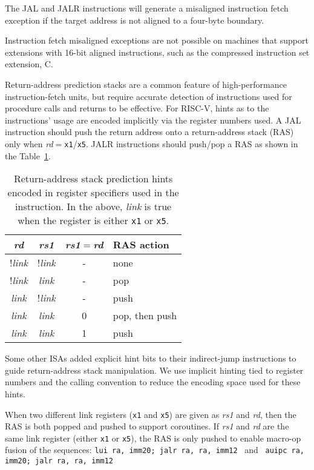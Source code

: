 The JAL and JALR instructions will generate a misaligned instruction
fetch exception if the target address is not aligned to a four-byte
boundary.

\begin{commentary}
Instruction fetch misaligned exceptions are not possible on machines
that support extensions with 16-bit aligned instructions, such as the
compressed instruction set extension, C.
\end{commentary}

Return-address prediction stacks are a common feature of
high-performance instruction-fetch units, but require accurate
detection of instructions used for procedure calls and returns to be
effective.  For RISC-V, hints as to the instructions' usage are encoded
implicitly via the register numbers used.  A JAL instruction should
push the return address onto a return-address stack (RAS) only when
{\em rd}$=${\tt x1}/{\tt x5}.  JALR instructions should push/pop a
RAS as shown in the Table~\ref{rashints}.
\begin{table}[hbt]
\centering
\begin{tabular}{|c|c|c|l|}
  \hline
  \em rd & \em rs1 & {\em rs1}$=${\em rd} & RAS action \\
  \hline
  !{\em link} & !{\em link} & - & none \\
  !{\em link} &  {\em link} & - & pop \\
   {\em link} & !{\em link} & - & push  \\
   {\em link} &  {\em link} & 0 & pop, then push \\
   {\em link} &  {\em link} & 1 & push \\
   \hline
\end{tabular}
\caption{Return-address stack prediction hints encoded in register
  specifiers used in the instruction.  In the above, {\em link} is
  true when the register is either {\tt x1} or {\tt x5}.}
\label{rashints}
\end{table}

\begin{commentary}
Some other ISAs added explicit hint bits to their indirect-jump instructions
to guide return-address stack manipulation.  We use implicit hinting tied to
register numbers and the calling convention to reduce the encoding space used
for these hints.

When two different link registers ({\tt x1} and {\tt x5}) are given as
{\em rs1} and {\em rd}, then the RAS is both popped and pushed to
support coroutines.  If {\em rs1} and {\em rd} are the same link
register (either {\tt x1} or {\tt x5}), the RAS is only pushed to
enable macro-op fusion of the sequences:\linebreak
{\tt lui ra, imm20; jalr ra, ra, imm12} \ and \ 
{\tt auipc ra, imm20; jalr ra, ra, imm12}
\end{commentary}

